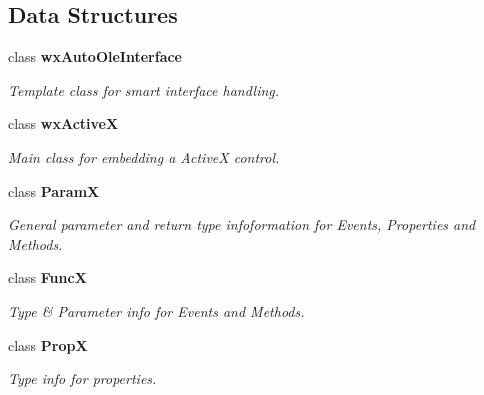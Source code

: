 \subsection*{Data Structures}
\begin{CompactItemize}
\item 
class {\bf wx\-Auto\-Ole\-Interface}
\begin{CompactList}\small\item\em Template class for smart interface handling.\item\end{CompactList}\item 
class {\bf wx\-Active\-X}
\begin{CompactList}\small\item\em Main class for embedding a Active\-X control.\item\end{CompactList}\item 
class {\bf Param\-X}
\begin{CompactList}\small\item\em General parameter and return type infoformation for Events, Properties and Methods.\item\end{CompactList}\item 
class {\bf Func\-X}
\begin{CompactList}\small\item\em Type \& Parameter info for Events and Methods.\item\end{CompactList}\item 
class {\bf Prop\-X}
\begin{CompactList}\small\item\em Type info for properties.\item\end{CompactList}\end{CompactItemize}
